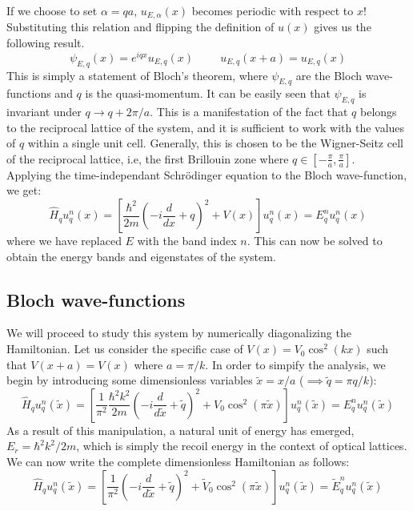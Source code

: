 If we choose to set $\alpha = qa$, $u_{E, \alpha}(x)$ becomes periodic with respect to $x$! Substituting this relation and flipping the definition of $u(x)$ gives us the following result. 
\begin{equation}
    \psi_{E, q}(x) = e^{iqx}u_{E, q}(x) \hspace{1cm}u_{E,q}(x + a) = u_{E, q}(x)
\end{equation}
This is simply a statement of Bloch's theorem, where $\psi_{E, q}$ are the Bloch wave-functions and $q$ is the quasi-momentum. It can be easily seen that $\psi_{E, q}$ is invariant under $q \to q + 2\pi/a$. This is a manifestation of the fact that $q$ belongs to the reciprocal lattice of the system, and it is sufficient to work with the values of $q$ within a single unit cell. Generally, this is chosen to be the Wigner-Seitz cell of the reciprocal lattice, i.e, the first Brillouin zone where $q \in [-\frac{\pi}{a}, \frac{\pi}{a}]$.
\vspace{0.5cm}\\
Applying the time-independant Schr\"{o}dinger equation to the Bloch wave-function, we get:
\begin{equation}
    \hat{H}_q u_q^n(x) = \left [\frac{\hbar^2}{2m}\left (-i\frac{d}{d x} + q \right )^2 + V(x)\right ] u_q^n(x) = E_q^n u_q^n(x)
\end{equation}
where we have replaced $E$ with the band index $n$. This can now be solved to obtain the energy bands and eigenstates of the system. 

\subsection{Bloch wave-functions}
We will proceed to study this system by numerically diagonalizing the Hamiltonian. Let us consider the specific case of $V(x) = V_0 \cos^2(kx)$ such that $V(x + a) = V(x)$ where $a = \pi/k$. In order to simpify the analysis, we begin by introducing some dimensionless variables $\tilde{x} = x/a$ ($\implies \tilde q = \pi q/k$):
\begin{equation}
    \hat{H}_q u_q^n(\tilde x) = \left [\frac{1}{\pi^2}\frac{\hbar^2k^2}{2m}\left (-i\frac{d}{d \tilde x} + \tilde q \right )^2 + V_0\cos^2(\pi\tilde x)\right ] u_q^n(\tilde x) = E_q^n u_q^n(\tilde x)
\end{equation}
As a result of this manipulation, a natural unit of energy has emerged, $E_r = \hbar^2k^2/2m$, which is simply the recoil energy in the context of optical lattices. We can now write the complete dimensionless Hamiltonian as follows: 
\begin{equation}\label{eq:1}
    \hat{H}_q u_q^n(\tilde x) = \left [\frac{1}{\pi^2} \left (-i\frac{d}{d \tilde x} + \tilde q \right )^2 +  \tilde V_0\cos^2(\pi\tilde x)\right ] u_q^n(\tilde x) = \tilde E_q^n u_q^n(\tilde x)
\end{equation}

